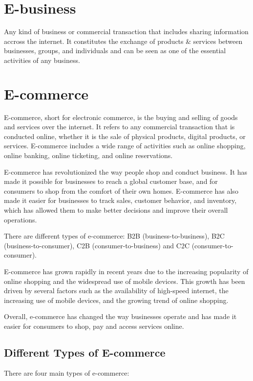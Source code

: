 \documentclass[twocolumn, 12pt, a4paper]{article}
\begin{document}
\section{E-business}
Any kind of business or commercial transaction that includes sharing
information accross the internet. It constitutes the exchange of products \& 
services between businesses, groups, and individuals and can be seen as one of
the essential activities of any business.

\section{E-commerce}
E-commerce, short for electronic commerce, is the buying and selling of goods
and services over the internet. It refers to any commercial transaction that is
conducted online, whether it is the sale of physical products, digital
products, or services. E-commerce includes a wide range of activities such as
online shopping, online banking, online ticketing, and online reservations.

E-commerce has revolutionized the way people shop and conduct business. It has
made it possible for businesses to reach a global customer base, and for
consumers to shop from the comfort of their own homes. E-commerce has also made
it easier for businesses to track sales, customer behavior, and inventory,
which has allowed them to make better decisions and improve their overall
operations.

There are different types of e-commerce: B2B (business-to-business), B2C
(business-to-consumer), C2B (consumer-to-business) and C2C
(consumer-to-consumer).

E-commerce has grown rapidly in recent years due to the increasing popularity
of online shopping and the widespread use of mobile devices. This growth has
been driven by several factors such as the availability of high-speed internet,
the increasing use of mobile devices, and the growing trend of online shopping.

Overall, e-commerce has changed the way businesses operate and has made it
easier for consumers to shop, pay and access services online.

\subsection{Different Types of E-commerce}
There are four main types of e-commerce:
\end{document}
